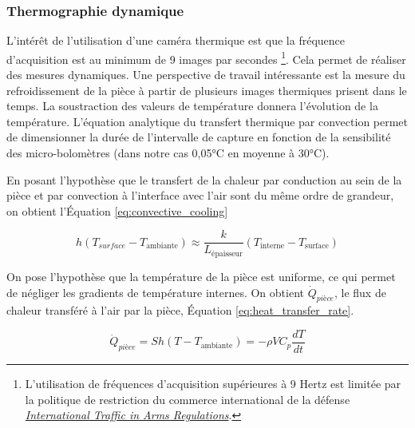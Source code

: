 \subsubsection{Thermographie dynamique}
L'intérêt de l'utilisation d'une caméra thermique est que la fréquence d'acquisition est au minimum de 9 images par secondes \footnote{L'utilisation de fréquences d'acquisition supérieures à 9 Hertz est limitée par la politique de restriction du commerce international de la défense \textit{\href{https://fr.wikipedia.org/wiki/International_Traffic_in_Arms_Regulations}{International Traffic in Arms Regulations}}.}.
Cela permet de réaliser des mesures dynamiques.
Une perspective de travail intéressante est la mesure du refroidissement de la pièce à partir de plusieurs images thermiques prisent dans le temps.
La soustraction des valeurs de température donnera l'évolution de la température.
L'équation analytique du transfert thermique par convection permet de dimensionner la durée de l'intervalle de capture en fonction de la sensibilité des micro-bolomètres (dans notre cas 0,05°C en moyenne à 30°C).

En posant l'hypothèse que le transfert de la chaleur par conduction au sein de la pièce et par convection à l'interface avec l'air sont du même ordre de grandeur, on obtient l'Équation \ref{eq:convective_cooling}

\begin{equation} \label{eq:convective_cooling}
h\left(T_{surface}-T_{\text{ambiante}}\right) \approx \frac{k}{L_{\text{épaisseur}}}\left(T_{\text{interne}}-T_{\text{surface}}\right)
\end{equation}

On pose l'hypothèse que la température de la pièce est uniforme, ce qui permet de négliger les gradients de température internes.
On obtient $\dot{Q}_{\mathrm{\textit{pièce}}}$, le flux de chaleur transféré à l'air par la pièce, Équation \ref{eq:heat_transfer_rate}.

\begin{equation} \label{eq:heat_transfer_rate}
\dot{Q}_{\mathrm{\textit{pièce}}} = S h\left(T-T_{\text{ambiante}}\right)=-\rho V C_p \frac{d T}{d t}
\end{equation}

